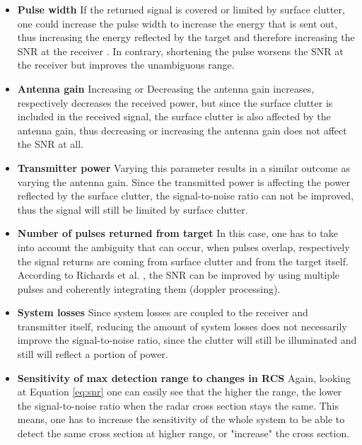\begin{itemize}
	\item \textbf{Pulse width}\newline
		If the returned signal is covered or limited by surface clutter, one could increase the pulse width to increase the energy that is sent out, thus increasing the energy reflected by the target and therefore increasing the SNR at the receiver \citep{richards2010principles}.
		In contrary, shortening the pulse worsens the SNR at the receiver but improves the unambiguous range.		
	\item \textbf{Antenna gain} \newline
		Increasing or Decreasing the antenna gain increases, respectively decreases the received power, but since the surface clutter is included in the received signal, the surface clutter is also affected by the antenna gain, thus decreasing or increasing the antenna gain does not affect the SNR at all.
	\item \textbf{Transmitter power}\newline
		Varying this parameter results in a similar outcome as varying the antenna gain. Since the transmitted power is affecting the power reflected by the surface clutter, the signal-to-noise ratio can not be improved, thus the signal will still be limited by surface clutter.
	\item \textbf{Number of pulses returned from target}\newline
		In this case, one has to take into account the ambiguity that can occur, when pulses overlap, respectively the signal returns are coming from surface clutter and from the target itself. According to Richards et al. \citep{richards2010principles}, the SNR can be improved by using multiple pulses and coherently integrating them (doppler processing).
	\item \textbf{System losses}\newline
		Since system losses are coupled to the receiver and transmitter itself, reducing the amount of system losses does not necessarily improve the signal-to-noise ratio, since the clutter will still be illuminated and still will reflect a portion of power.
	\item \textbf{Sensitivity of max detection range to changes in RCS}
		Again, looking at Equation \ref{eq:snr} one can easily see that the higher the range, the lower the signal-to-noise ratio when the radar cross section stays the same. This means, one has to increase the sensitivity of the whole system to be able to detect the same cross section at higher range, or "increase" the cross section.
\end{itemize}


